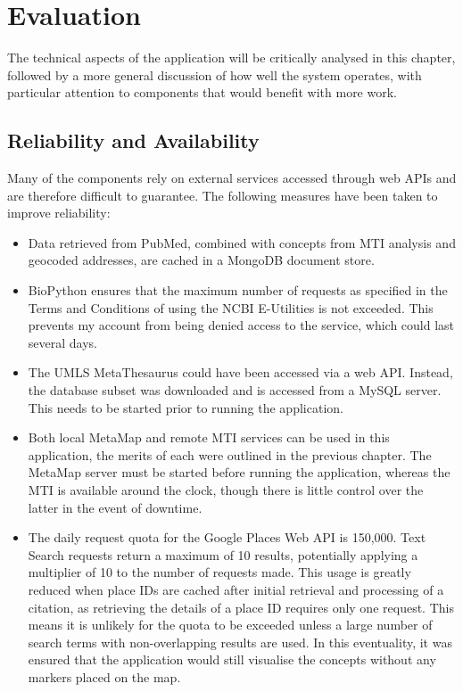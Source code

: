 \documentclass[Report.tex]{subfiles}
\begin{document}
\chapter{Evaluation}
The technical aspects of the application will be critically analysed in this chapter, followed by a more general discussion of how well the system operates, with particular attention to components that would benefit with more work.
 
\section{Reliability and Availability}
Many of the components rely on external services accessed through web APIs and are therefore difficult to guarantee. The following measures have been taken to improve reliability:
\begin{itemize}
\item Data retrieved from PubMed, combined with concepts from MTI analysis and geocoded addresses, are cached in a MongoDB document store.
\item BioPython ensures that the maximum number of requests as specified in the Terms and Conditions of using the NCBI E-Utilities \cite{eutils} is not exceeded. This prevents my account from being denied access to the service, which could last several days. 
\item The UMLS MetaThesaurus could have been accessed via a web API. Instead, the database subset was downloaded and is accessed from a MySQL server. This needs to be started prior to running the application. 
\item Both local MetaMap and remote MTI services can be used in this application, the merits of each were outlined in the previous chapter. The MetaMap server must be started before running the application, whereas the MTI is available around the clock, though there is little control over the latter in the event of downtime.
\item The daily request quota for the Google Places Web API is 150,000. Text Search requests return a maximum of 10 results, potentially applying a multiplier of 10 to the number of requests made. This usage is greatly reduced when place IDs are cached after initial retrieval and processing of a citation, as retrieving the details of a place ID requires only one request. This means it is unlikely for the quota to be exceeded unless a large number of search terms with non-overlapping results are used. In this eventuality, it was ensured that the application would still visualise the concepts without any markers placed on the map.
\end{itemize}
\end{document}
